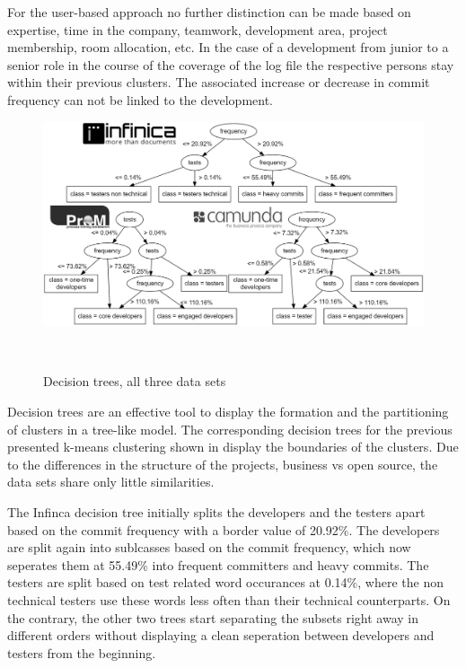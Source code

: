 For the user-based approach no further distinction can be made based on expertise, time in the company, teamwork, development area, project membership, room allocation, etc. In the case of a development from junior to a senior role in the course of the coverage of the log file the respective persons stay within their previous clusters. The associated increase or decrease in commit frequency can not be linked to the development. %


\begin{figure}
   \includegraphics[width=\columnwidth]{ResourceClassification/figures/4ktrees.png}
   \caption{Decision trees, all three data sets}\
   \label{fig:trees}
\end{figure}


Decision trees are an effective tool to display the formation and the partitioning of clusters in a tree-like model. The corresponding decision trees for the previous presented k-means clustering shown in  display the boundaries of the clusters. Due to the differences in the structure of the projects, business vs open source, the data sets share only little similarities.

The Infinca decision tree initially splits the developers and the testers apart based on the commit frequency with a border value of 20.92\%. The developers are split again into sublcasses based on the commit frequency, which now seperates them at 55.49\% into frequent committers and heavy commits. The testers are split based on test related word occurances at 0.14\%, where the non technical testers use these words less often than their technical counterparts. On the contrary, the other two trees start separating the subsets right away in different orders without displaying a clean seperation between developers and testers from the beginning.

